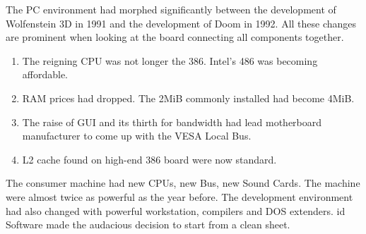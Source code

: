 The PC environment had morphed significantly between the development of Wolfenstein 3D in 1991 and the development of Doom in 1992. All these changes are prominent when looking at the board connecting all components together.\\
\par
{}
\par
\begin{enumerate}
\item The reigning CPU was not longer the 386. Intel's 486 was becoming affordable.
\item RAM prices had dropped. The 2MiB commonly installed had become 4MiB. 
\item The raise of GUI and its thirth for bandwidth had lead motherboard manufacturer to come up with the VESA Local Bus.
\item L2 cache found on high-end 386 board were now standard.
\end{enumerate}

The consumer machine had new CPUs, new Bus, new Sound Cards. The machine were almost twice as powerful as the year before. The development environment had also changed with powerful workstation, compilers and DOS extenders. id Software made the audacious decision to start from a clean sheet.\\




